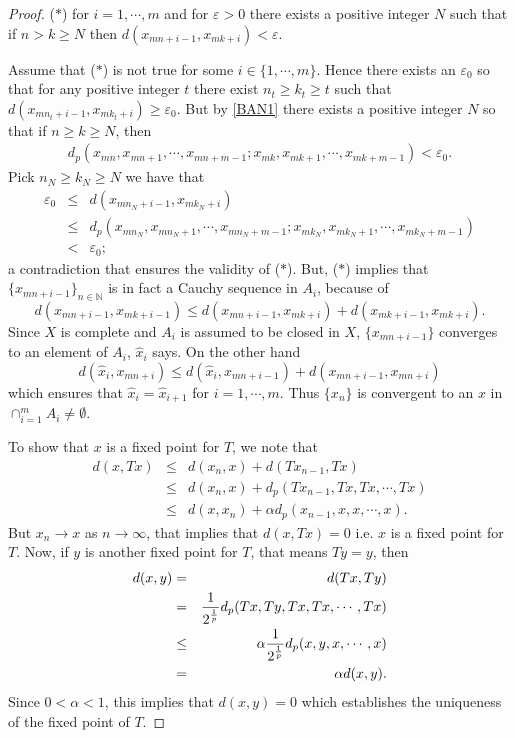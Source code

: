 \documentclass{amsart}
\theoremstyle{definition}
\theoremstyle{remark}
\begin{document}
\begin{proof}
($\ast$) for $i=1,\cdots,m$ and for $\varepsilon>0$ there exists a positive integer $N$ such that if $n>k\geq N$ then $d(x_{mn+i-1},x_{mk+i})<\varepsilon.$

Assume that ($\ast$) is not true for some $i\in\{1,\cdots,m\}$. Hence there exists an $\varepsilon_0$ so that for any positive integer $t$ there exist $n_t\geq k_t\geq t$ such that $d(x_{mn_t+i-1},x_{mk_t+i})\geq\varepsilon_0.$ But by \eqref{BAN1}  there exists a positive integer $N$ so that if $n\geq k\geq N$, then
\begin{eqnarray*}
d_p(x_{mn},x_{mn+1},\cdots,x_{mn+m-1};x_{mk},x_{mk+1},\cdots,x_{mk+m-1})<\varepsilon_0.
\end{eqnarray*}
Pick $n_N\geq k_N\geq N$ we have that
\begin{eqnarray*}
\varepsilon_0&\leq& d(x_{mn_N+i-1},x_{mk_N+i})\\&\leq& d_p(x_{mn_N},x_{mn_N+1},\cdots,x_{mn_N+m-1};x_{mk_N},x_{mk_N+1},\cdots,x_{mk_N+m-1})\\&<&\varepsilon_0;
\end{eqnarray*} a contradiction that ensures the validity of ($\ast$). But,
($\ast$) implies that $\{x_{mn+i-1}\}_{n\in\mathbb{N}}$ is in fact a Cauchy sequence in $A_i$, because of
$$d(x_{mn+i-1},x_{mk+i-1})\leq d(x_{mn+i-1},x_{mk+i})+d(x_{mk+i-1},x_{mk+i}).$$
 Since $X$ is complete and $A_i$ is assumed to be closed in $X$, $\{x_{mn+i-1}\}$ converges to an element of $A_i$, $\hat{x}_i$ says. On the other hand $$d(\hat{x}_i,x_{mn+i})\leq d(\hat{x}_i,x_{mn+i-1})+d(x_{mn+i-1},x_{mn+i})$$ which ensures that $\hat{x}_i=\hat{x}_{i+1}$ for $i=1,\cdots,m$. Thus $\{x_n\}$ is convergent to an $x$ in $\cap_{i=1}^mA_i\neq\emptyset$.

 To show that $x$ is a fixed point for $T$, we note that
 \begin{eqnarray*}
 d(x,Tx)&\leq& d(x_n,x)+d(Tx_{n-1},Tx)\\&\leq& d(x_n,x)+d_p(Tx_{n-1},Tx,Tx,\cdots,Tx)\\&\leq& d(x,x_n)+\alpha d_p(x_{n-1},x,x,\cdots,x).
 \end{eqnarray*}But $x_n\to x$ as $n\to\infty$, that implies that $d(x,Tx)=0$ i.e. $x$ is a fixed point for $T$. Now, if $y$ is another fixed point for $T$, that means $Ty=y$, then
 \begin{eqnarray*}d(x,y)&=&d(Tx,Ty)\\&=& {{1}\over{2^{{1}\over{p}}}}d_p(Tx,Ty,Tx,Tx,\cdots,Tx)\\&\leq&\alpha {{1}\over{2^{{1}\over{p}}}}d_p(x,y,x,\cdots,x)\\&=&\alpha d(x,y).\end{eqnarray*} Since $0<\alpha<1$, this implies that $d(x,y)=0$ which establishes the uniqueness of the fixed point of $T$.
 \end{proof}
\end{document}
